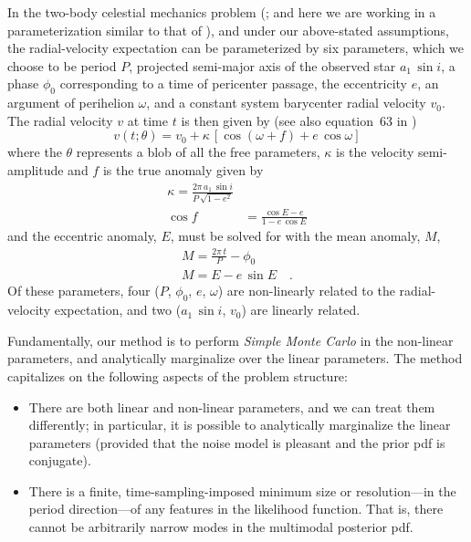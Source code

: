 \documentclass[12pt, preprint]{aastex6}
\newcommand{\asini}{\ensuremath{a_1\,\sin i}}
\begin{document}
In the two-body celestial mechanics problem (\citealt{Kepler:1609}; and here we
are working in a parameterization similar to that of \citealt{Murray:2010}), and
under our above-stated assumptions, the radial-velocity expectation can be
parameterized by six parameters, which we choose to be period $P$, projected
semi-major axis of the observed star $\asini$, a phase $\phi_0$ corresponding to
a time of pericenter passage, the eccentricity $e$, an argument of perihelion
$\omega$, and a constant system barycenter radial velocity $v_0$.
The radial velocity $v$ at time $t$ is then given by (see also
equation~63 in \citealt{Murray:2010})
\begin{equation}
  v(t;\theta) = v_0 + \kappa\,[\cos(\omega + f) + e\,\cos\omega]
\end{equation}
where the $\theta$ represents a blob of all the free parameters,
$\kappa$ is the velocity semi-amplitude and $f$ is the true anomaly
given by
\begin{align}
  \kappa = \frac{2\pi\,\asini}{P\,\sqrt{1-e^2}}\\
  \cos f &= \frac{\cos E - e}{1 - e\, \cos E}
\end{align}
and the eccentric anomaly, $E$, must be solved for with the mean
anomaly, $M$,
\begin{align}
  M = \frac{2\pi\, t}{P} - \phi_0\\
  M = E - e\,\sin E \quad .
\end{align}
Of these parameters, four ($P$, $\phi_0$, $e$, $\omega$) are
non-linearly related to the radial-velocity expectation, and two
($\asini$, $v_0$) are linearly related.

Fundamentally, our method is to perform \emph{Simple Monte Carlo} in
the non-linear parameters, and analytically marginalize over the linear
parameters.
The method capitalizes on the following aspects of the problem
structure:
\begin{itemize}
\item There are both linear and non-linear parameters, and we can
  treat them differently; in particular, it is possible to
  analytically marginalize the linear parameters (provided that the
  noise model is pleasant and the prior pdf is conjugate).
\item There is a finite, time-sampling-imposed minimum size or
  resolution---in the period direction---of any features in the
  likelihood function. That is, there cannot be arbitrarily narrow
  modes in the multimodal posterior pdf.
\end{itemize}
\end{document}
